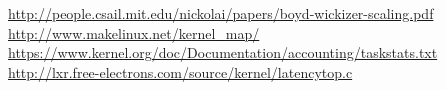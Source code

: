 \documentclass[12pt]{article}
\begin{document}
  \begin{thebibliography}{1}

   \url{http://people.csail.mit.edu/nickolai/papers/boyd-wickizer-scaling.pdf}
   \url{http://www.makelinux.net/kernel_map/}
   \url{https://www.kernel.org/doc/Documentation/accounting/taskstats.txt}
   \url{http://lxr.free-electrons.com/source/kernel/latencytop.c}
  \end{thebibliography}
\end{document}
